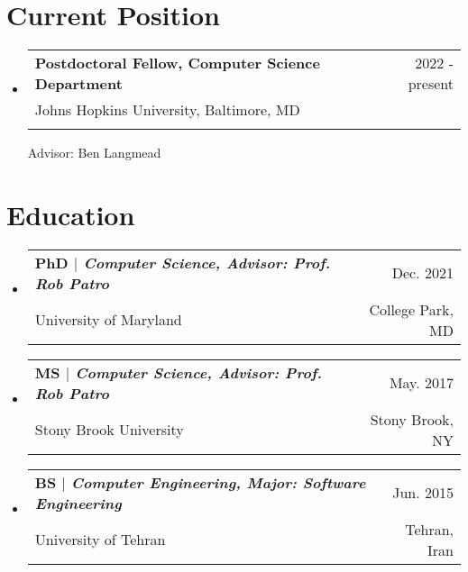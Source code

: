 \documentclass[A4,11pt]{article}
\makeatletter
\newcommand{\CVSubheading}[4]{
  \vspace{-2pt}\item
    \begin{tabular*}{0.97\textwidth}[t]{l@{\extracolsep{\fill}}r}
      \textbf{#1} & #2 \\
      \small#3 & \small #4 \\
    \end{tabular*}\vspace{-7pt}
}
\newcommand{\CVSubHeadingListStart}{\begin{itemize}[leftmargin=0.5cm, label={}]}
\newcommand{\CVSubHeadingListEnd}{\end{itemize}}
\makeatother
\begin{document}
\begin{comment}
This CV was written for specifically for positions I was applying for in
academia, and then modified to be a template.

A standard CV is about two pages long where as a resume in the US is one page.
sections can be added and removed here with this in mind. In my experience, 
education, and applicable work experience and skills are the most import things
to include on a resume. For a CV the Europass CV suggests the categories: Work
Experience, Education and Training, Language Skills, Digital Skills,
Communication and Interpersonal Skills, Conferences and Seminars, Creative Works
Driver's License, Hobbies and Interests, Honors and Awards, Management and
Leadership Skills, Networks and Memberships, Organizational Skills, Projects,
Publications, Recommendations, Social and Political Activities, Volunteering.

Your goal is to convey a who, what , when, where, why for every item you share. 
The who is obviously you, but I believe the rest should be done in that order.
For example below. An employer cares most about the degree held and typically 
less about the institution or where it is located (This is still good 
information though). Whatever order you choose be consistent throughout.
\end{comment}

\section{Current Position}
  \CVSubHeadingListStart
    \CVSubheading{Postdoctoral Fellow, Computer Science Department}{2022 - present}
      {Johns Hopkins University, Baltimore, MD}\\
      {Advisor: Ben Langmead}{ }
  \CVSubHeadingListEnd


\section{Education}
  \CVSubHeadingListStart
    \CVSubheading
      {{PhD $|$ \emph{\small{Computer Science, Advisor: Prof. Rob Patro}}}}{Dec. 2021}
      {University of Maryland}{College Park, MD}
    \CVSubheading
      {{MS $|$ \emph{\small{Computer Science, Advisor: Prof. Rob Patro}}}}{May. 2017}
      {Stony Brook University}{Stony Brook, NY}
    \CVSubheading
      {{BS $|$ \emph{\small{Computer Engineering, Major: Software Engineering}}}}{Jun. 2015}
      {University of Tehran}{Tehran, Iran}
  \CVSubHeadingListEnd
\end{document}
